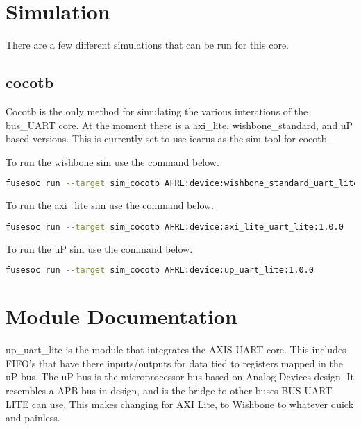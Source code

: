 \newpage

\section{Simulation}
\par
There are a few different simulations that can be run for this core.

\subsection{cocotb}
\par
Cocotb is the only method for simulating the various interations of the bus\_UART core. At the moment there is a
axi\_lite, wishbone\_standard, and uP based versions. This is currently set to use icarus as the sim tool for cocotb.

\par
To run the wishbone sim use the command below.
\begin{lstlisting}[language=bash]
fusesoc run --target sim_cocotb AFRL:device:wishbone_standard_uart_lite:1.0.0
\end{lstlisting}

\par
To run the axi\_lite sim use the command below.
\begin{lstlisting}[language=bash]
fusesoc run --target sim_cocotb AFRL:device:axi_lite_uart_lite:1.0.0
\end{lstlisting}

\par
To run the uP sim use the command below.
\begin{lstlisting}[language=bash]
fusesoc run --target sim_cocotb AFRL:device:up_uart_lite:1.0.0
\end{lstlisting}

\newpage

\section{Module Documentation} \label{Module Documentation}

\par
up\_uart\_lite is the module that integrates the AXIS UART core.
This includes FIFO's that have there inputs/outputs for data tied to registers mapped in the uP bus.
The uP bus is the microprocessor bus based on Analog Devices design. It resembles a APB bus in design,
and is the bridge to other buses BUS UART LITE can use. This makes changing for AXI Lite, to Wishbone to whatever
quick and painless.

